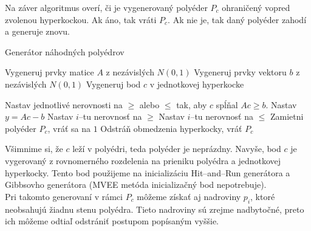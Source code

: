 Na záver algoritmus overí, či je vygenerovaný polyéder $P_c$ ohraničený vopred zvolenou hyperkockou. Ak áno, tak vráti $P_c$. Ak nie je, tak daný polyéder zahodí a generuje znovu.

\begin{algorithm}[H]
	\caption{Generátor náhodných polyédrov \cite{random_may}}
	\label{generator-polyedrov}
	\begin{algorithmic}[1]
		\State Vygeneruj prvky matice $A$ z nezávislých $N(0,1)$
		\State Vygeneruj prvky vektoru $b$ z nezávislých $N(0,1)$
		\State Vygeneruj bod $c$ v jednotkovej hyperkocke

		\State Nastav jednotlivé nerovnosti na $\geq$ alebo $\leq$ tak, aby $c$ spĺňal $Ac\geq b$.
		\State Nastav $y=Ac-b$
				\State Nastav $i$--tu nerovnosť na $\ge$
			\Else
				\State Nastav $i$--tu nerovnosť na $\le$
			\EndIf
		\EndFor
			\State Zamietni polyéder $P_c$, vráť sa na $1$
		\Else
			\State Odstráň obmedzenia hyperkocky, vráť $P_c$
		\EndIf
	\end{algorithmic}
\end{algorithm}

Všimnime si, že $c$ leží v polyédri, teda polyéder je neprázdny. Navyše, bod $c$ je vygerovaný z rovnomerného rozdelenia na prieniku polyédra a jednotkovej hyperkocky. Tento bod použijeme na inicializáciu Hit--and--Run generátora a Gibbsovho generátora (MVEE metóda inicializačný bod nepotrebuje).\\

Pri takomto generovaní v rámci $P_c$ môžeme získať aj nadroviny $p_i$, ktoré neobsahujú žiadnu stenu polyédra. Tieto nadroviny sú zrejme nadbytočné, preto ich môžeme odtiaľ odstrániť postupom popísaným vyššie.\\

